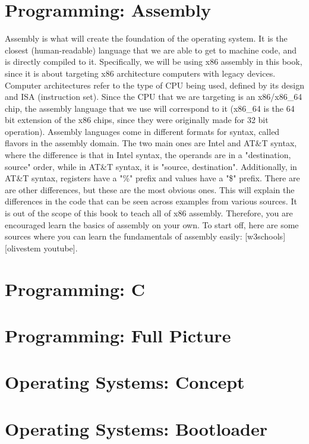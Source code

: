 \documentclass[openany, 12px]{book}
\begin{document}
\section{Programming: Assembly}
Assembly is what will create the foundation of the operating system. It is the closest (human-readable) language that we are able to get to machine code, and is directly compiled to it. Specifically, we will be using x86 assembly in this book, since it is about targeting x86 architecture computers with legacy devices. Computer architectures refer to the type of CPU being used, defined by its design and ISA (instruction set). Since the CPU that we are targeting is an x86/x86\_64 chip, the assembly language that we use will correspond to it (x86\_64 is the 64 bit extension of the x86 chips, since they were originally made for 32 bit operation). Assembly languages come in different formats for syntax, called flavors in the assembly domain. The two main ones are Intel and AT\&T syntax, where the difference is that in Intel syntax, the operands are in a "destination, source" order, while in AT\&T syntax, it is "source, destination". Additionally, in AT\&T syntax, registers have a "\%" prefix and values have a "\$" prefix. There are are other differences, but these are the most obvious ones. This will explain the differences in the code that can be seen across examples from various sources. It is out of the scope of this book to teach all of x86 assembly. Therefore, you are encouraged learn the basics of assembly on your own. To start off, here are some sources where you can learn the fundamentals of assembly easily: [w3schools] [olivestem youtube].

\section{Programming: C}


\section{Programming: Full Picture}


\section{Operating Systems: Concept}


\section{Operating Systems: Bootloader}
\end{document}
